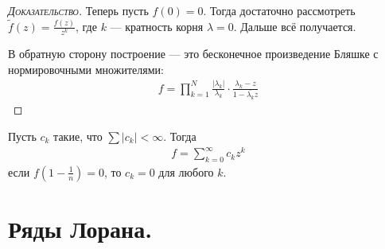 \documentclass[../../main.tex]{subfiles}
\begin{document}
\begin{proof}[\normalfont\textsc{Доказательство}]
 Теперь пусть $ f(0) = 0 $. Тогда достаточно рассмотреть  $ \tilde f(z) = \frac{f(z)}{z^{k}} $, где $ k $ --- кратность корня $ \lambda = 0 $. Дальше всё получается.

 В обратную сторону построение --- это бесконечное произведение Бляшке с нормировочными множителями:
  \begin{align*}
   f = \prod_{k=1}^{N} \frac{\left| \lambda_k \right|}{\lambda_k} \cdot \frac{\lambda_k -z}{1 - \overline{\lambda_k} z}
 \end{align*}
\end{proof}

\begin{exmpl*}
 Пусть $ c_k $ такие, что $ \sum \left| c_k \right| < \infty $. Тогда
 \begin{align*}
  f = \sum_{k=0}^{\infty} c_k z^{k}
 \end{align*} если $ f\left(1 - \frac{1}{n}\right) = 0 $, то $ c_k = 0 $ для любого $ k $.
\end{exmpl*}

\newpage
\section{Ряды Лорана.}
\end{document}
